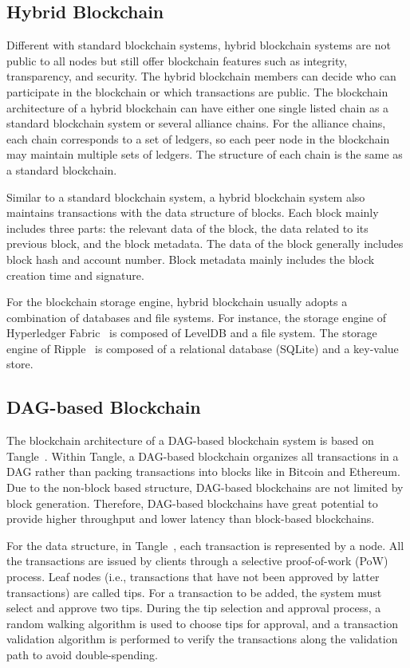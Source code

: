 \documentclass[acmsmall]{acmart}
\begin{document}
\subsection{Hybrid Blockchain}

Different with standard blockchain systems, hybrid blockchain systems are not public to all nodes but still offer blockchain features such as integrity, transparency, and security. The hybrid blockchain members can decide who can participate in the blockchain or which transactions are public. The blockchain architecture of a hybrid blockchain can have either one single listed chain as a standard blockchain system or several alliance chains. For the alliance chains, each chain corresponds to a set of ledgers, so each peer node in the blockchain may maintain multiple sets of ledgers. The structure of each chain is the same as a standard blockchain.

Similar to a standard blockchain system, a hybrid blockchain system also maintains transactions with the data structure of blocks. Each block mainly includes three parts: the relevant data of the block, the data related to its previous block, and the block metadata. The data of the block generally includes block hash and account number. Block metadata mainly includes the block creation time and signature.

For the blockchain storage engine, hybrid blockchain usually adopts a combination of databases and file systems. For instance, the storage engine of Hyperledger Fabric~\cite{cachin2016architecture} is composed of LevelDB and a file system. The storage engine of Ripple~\cite{armknecht2015ripple} is composed of a relational database (SQLite) and a key-value store.

\subsection{DAG-based Blockchain}
The blockchain architecture of a DAG-based blockchain system is based on Tangle~\cite{popov2016tangle}. Within Tangle, a DAG-based blockchain organizes all transactions in a DAG rather than packing transactions into blocks like in Bitcoin and Ethereum. Due to the non-block based structure, DAG-based blockchains are not limited by block generation. Therefore, DAG-based blockchains have great potential to provide higher throughput and lower latency than block-based blockchains.

For the data structure, in Tangle~\cite{attias2018tangle,popov2019equilibria}, each transaction is represented by a node. All the transactions are issued by clients through a selective proof-of-work (PoW) process. Leaf nodes (i.e., transactions that have not been approved by latter transactions) are called tips. For a transaction to be added, the system must select and approve two tips. During the tip selection and approval process, a random walking algorithm is used to choose tips for approval, and a transaction validation algorithm is performed to verify the transactions along the validation path to avoid double-spending.
\end{document}
